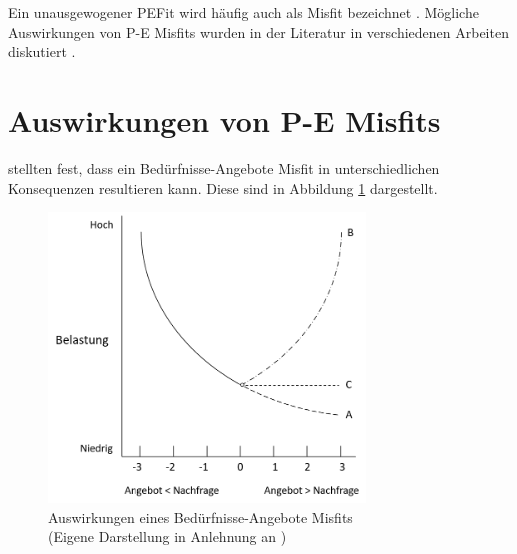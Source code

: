 Ein unausgewogener \ac{PEFit} wird häufig auch als Misfit bezeichnet \cite[S. 2]{edwards:2004}\cite[S. 4]{kristof:1996}. Mögliche Auswirkungen von P-E Misfits wurden in der Literatur in verschiedenen Arbeiten diskutiert \cite[S. 5f.]{caplan:1987}\cite[S. 21ff.]{edwards:2008}\cite{mechanismsOfJobStressAndStrain:1982}\cite[S. 9ff.]{harrison:1978}.

\section{Auswirkungen von P-E Misfits}
\label{ch:personEnvironmentFit:auswirkungenErhoehterAngebote}
\textcite{mechanismsOfJobStressAndStrain:1982} stellten fest, dass ein Bedürfnisse-Angebote Misfit in unterschiedlichen Konsequenzen resultieren kann. Diese sind in Abbildung \ref{fig:personEnvironmentFit:auswirkungenErhoehterAngebote:abb1} dargestellt.

\begin{figure}[h]
	\centering
	\includegraphics[width=0.75\textwidth]{gfx/ueberschuss_supply_motive.png}
	\caption[Auswirkungen eines Bedürfnisse-Angebote Misfits]{Auswirkungen eines Bedürfnisse-Angebote Misfits\\(Eigene Darstellung in Anlehnung an \cite[S. 23]{edwards:2008})}
	\label{fig:personEnvironmentFit:auswirkungenErhoehterAngebote:abb1}
\end{figure}

